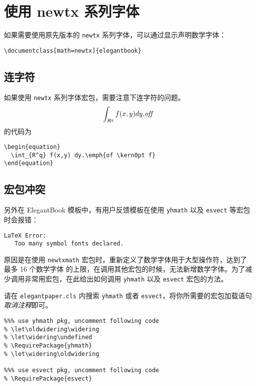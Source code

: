 \documentclass[lang=cn,11pt,a4paper,cite=authoryear]{elegantpaper}
\begin{document}
\nocite{*}


\appendix
\addappheadtotoc
\section{使用 newtx 系列字体}

如果需要使用原先版本的 \lstinline{newtx} 系列字体，可以通过显示声明数学字体：

\begin{lstlisting}
\documentclass[math=newtx]{elegantbook}
\end{lstlisting}

\subsection{连字符}

如果使用 \lstinline{newtx} 系列字体宏包，需要注意下连字符的问题。
\begin{equation}
  \int_{R^q} f(x,y) dy.\emph{of\kern0pt f}
\end{equation}
的代码为
\begin{lstlisting}
\begin{equation}
  \int_{R^q} f(x,y) dy.\emph{of \kern0pt f}
\end{equation}
\end{lstlisting}

\subsection{宏包冲突}

另外在 ElegantBook 模板中，有用户反馈模板在使用 \lstinline{yhmath} 以及 \lstinline{esvect} 等宏包时会报错：
\begin{lstlisting}
LaTeX Error:
   Too many symbol fonts declared.
\end{lstlisting}

原因是在使用 \lstinline{newtxmath} 宏包时，重新定义了数学字体用于大型操作符，达到了 {\heiti 最多 16 个数学字体} 的上限，在调用其他宏包的时候，无法新增数学字体。为了减少调用非常用宏包，在此给出如何调用 \lstinline{yhmath} 以及 \lstinline{esvect} 宏包的方法。

请在 \lstinline{elegantpaper.cls} 内搜索 \lstinline{yhmath} 或者 \lstinline{esvect}，将你所需要的宏包加载语句\textit{取消注释}即可。
\begin{lstlisting}
%%% use yhmath pkg, uncomment following code
% \let\oldwidering\widering
% \let\widering\undefined
% \RequirePackage{yhmath}
% \let\widering\oldwidering

%%% use esvect pkg, uncomment following code
% \RequirePackage{esvect}
\end{lstlisting}
\end{document}
